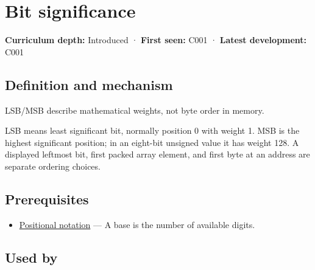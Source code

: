 \hypertarget{appendix-280445746493}{}\label{referencestart:appendix-280445746493}
\section{Bit significance}\label{appendix-280445746493-bit-significance}

\textbf{Curriculum depth:} Introduced · \textbf{First seen:} C001 · \textbf{Latest development:} C001

\begin{allmightroledefinition}

\subsection{Definition and mechanism}\label{appendix-280445746493-definition-and-mechanism}

LSB/MSB describe mathematical weights, not byte order in memory.

\end{allmightroledefinition}

LSB means least significant bit, normally position 0 with weight 1. MSB is the highest significant position; in an eight-bit unsigned value it has weight 128. A displayed leftmost bit, first packed array element, and first byte at an address are separate ordering choices.

\subsection{Prerequisites}\label{appendix-280445746493-prerequisites}

\begin{itemize}
\tightlist
\item
  \hyperref[appendix-83c3f28f7bda]{Positional notation} --- A base is the number of available digits.
\end{itemize}

\subsection{Used by}\label{appendix-280445746493-used-by}

